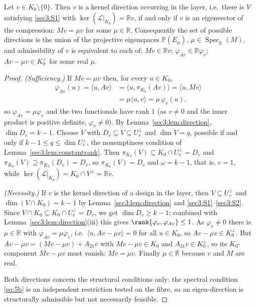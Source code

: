 \begin{thm}
\label{sec3:thm:direction}
\label{sec3:rem:direction-set}
\label{sec3:rem:equiv}
Let $v\in K_0\setminus\{0\}$. Then $v$ is a kernel direction occurring in the layer, i.e.\ there is
$V$ satisfying \ref{sec3:S1} with $\ker(\mathcal{L}|_{K_0})=\mathbb{R} v$, if and only if $v$ is an
eigenvector of the compression: $Mv=\mu v$ for some $\mu\in\mathbb{R}$. Consequently the set of
possible directions is the union of the projective eigenspaces
$\mathbb{P}(E_\mu)$, $\mu\in\operatorname{Spec}_{\mathbb{R}}(M)$, and admissibility of $v$ is
equivalent to each of: $Mv\in\mathbb{R} v$; $\varphi_{Av}\in\mathbb{R}\varphi_v$; $Av-\mu v\in K_0^\perp$
for some real $\mu$.
\end{thm}
\begin{proof}
\emph{(Sufficiency.)} If $Mv=\mu v$ then, for every $u\in K_0$,
\begin{align*}
\varphi_{Av}(u)=\langle u,Av\rangle
&=\langle u,\pi_{K_0}(Av)\rangle=\langle u,Mv\rangle\\
&=\mu\langle u,v\rangle=\mu\,\varphi_v(u),
\end{align*}
so $\varphi_{Av}=\mu\varphi_v$ and the two functionals have rank $1$ (as $v\neq0$ and the inner product
is positive definite, $\varphi_v\neq0$). By Lemma~\ref{sec3:lem:direction}, $\dim D_v=k-1$. Choose $V$
with $D_v\subseteq V\subseteq U_v^\perp$ and $\dim V=q$, possible if and only if
$k-1\le q\le\dim U_v^\perp$, the nonemptiness condition of Lemma~\ref{sec3:lem:constantrank}. Then
$\pi_{K_0}(V)\subseteq K_0\cap U_v^\perp=D_v$ and $\pi_{K_0}(V)\supseteq\pi_{K_0}(D_v)=D_v$, so
$\pi_{K_0}(V)=D_v$ and $\omega=k-1$, that is, $c=1$, while
$\ker(\mathcal{L}|_{K_0})=K_0\cap V^\perp=\mathbb{R} v$.

\emph{(Necessity.)} If $v$ is the kernel direction of a design in the layer, then
$V\subseteq U_v^\perp$ and $\dim(V\cap K_0)=k-1$ by Lemma~\ref{sec3:lem:direction} and
\ref{sec3:S1}--\ref{sec3:S2}. Since $V\cap K_0\subseteq K_0\cap U_v^\perp=D_v$, we get
$\dim D_v\ge k-1$; combined with Lemma~\ref{sec3:lem:direction}(iii) this gives
$\rank\{\varphi_v,\varphi_{Av}\}\le1$. As
$\varphi_v\neq0$ there is $\mu\in\mathbb{R}$ with $\varphi_{Av}=\mu\varphi_v$, i.e.\
$\langle u,Av-\mu v\rangle=0$ for all $u\in K_0$, so $Av-\mu v\in K_0^\perp$. But
$Av-\mu v=(Mv-\mu v)+A_{21}v$ with $Mv-\mu v\in K_0$ and $A_{21}v\in K_0^\perp$, so its
$K_0$-component $Mv-\mu v$ must vanish: $Mv=\mu v$. Finally $\mu\in\mathbb{R}$ because $v$ and $M$ are
real.

Both directions concern the structural conditions only: the spectral condition \eqref{eq:5b} is an
independent restriction tested on the fibre, so an eigen-direction is structurally admissible but not
necessarily feasible.
\end{proof}

